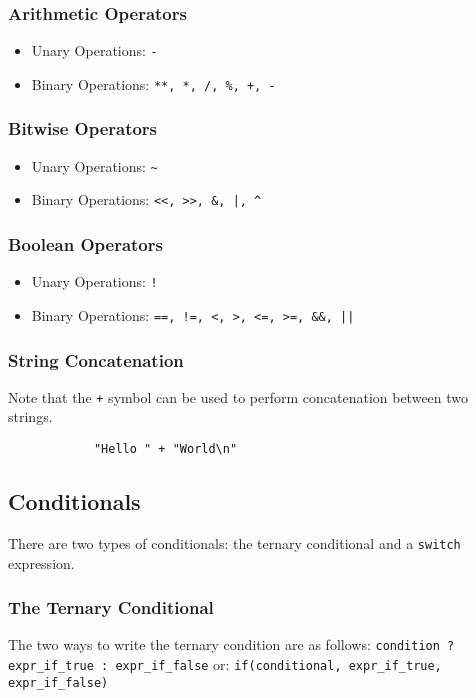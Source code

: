 		\subsubsection{Arithmetic Operators}
			\begin{itemize}
				\item Unary Operations: \texttt{-}
				\item Binary Operations: \texttt{**, *, /, \%, +, -}
			\end{itemize}

		\subsubsection{Bitwise Operators}
			\begin{itemize}
				\item Unary Operations: \texttt{\~}
				\item Binary Operations: \texttt{<<, >>, \&, |, \^}
			\end{itemize}

		\subsubsection{Boolean Operators}
			\begin{itemize}
				\item Unary Operations: \texttt{!}
				\item Binary Operations: \texttt{==, !=, <, >, <=, >=, \&\&, ||}
			\end{itemize}

		\subsubsection{String Concatenation}
		Note that the \texttt{+} symbol can be used to perform concatenation between two strings.

		\begin{lstlisting}
			"Hello " + "World\n"
		\end{lstlisting}

	\subsection{Conditionals}
	There are two types of conditionals: the ternary conditional and a \texttt{switch} expression.

		\subsubsection{The Ternary Conditional}
		The two ways to write the ternary condition are as follows: \newline \newline
		\texttt{condition ? expr\_if\_true : expr\_if\_false} \newline \newline
		or: \newline \newline
		\texttt{if(conditional, expr\_if\_true, expr\_if\_false)}

